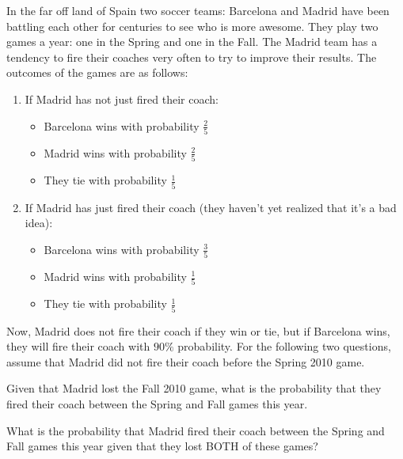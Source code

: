 \documentclass[12pt,oneside]{article}
\begin{document}
\begin{problem}{20}
In the far off land of Spain two soccer teams: Barcelona and Madrid have been battling each other for centuries to see who is more awesome. They play two games a year: one in the Spring and one in the Fall. The Madrid team has a tendency to fire their coaches very often to try to improve their results. The outcomes of the games are as follows:
\begin{enumerate}
\item
If Madrid has not just fired their coach:
\begin{itemize}
\item
Barcelona wins with probability $\frac25$
\item
Madrid wins with probability $\frac25$
\item
They tie with probability $\frac15$
\end{itemize}
\item
If Madrid has just fired their coach (they haven't yet realized that it's a bad idea):
\begin{itemize}
\item
Barcelona wins with probability $\frac35$
\item
Madrid wins with probability $\frac15$
\item
They tie with probability $\frac15$
\end{itemize}
\end{enumerate}
Now, Madrid does not fire their coach if they win or tie, but if Barcelona wins, they will fire their coach with $90\%$ probability.
For the following two questions, assume that Madrid did not fire their coach before the Spring 2010 game.

\bparts
{}
Given that Madrid lost the Fall 2010 game, what is the probability that they fired their coach between the Spring and Fall games this year.

\newpage
{}
What is the probability that Madrid fired their coach between the Spring and Fall games this year given that they lost BOTH of these games?
\eparts
\end{problem}

\newpage
\end{document}
